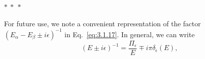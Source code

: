 \begin{center}
$*\ *\ *$
\end{center}

For future use, we note a convenient representation of the factor
$(E_\alpha-E_\beta\mathbin{\pm}i\epsilon)^{-1}$ in Eq.~\eqref{eq:3.1.17}. In
general, we can write
\begin{equation}
(E\mathbin{\pm}i\epsilon)^{-1}
=\frac{\Pi_\epsilon}{E}\mp i\pi\delta_\epsilon(E),
\tag{3.1.22}\label{eq:3.1.22}
\end{equation}
